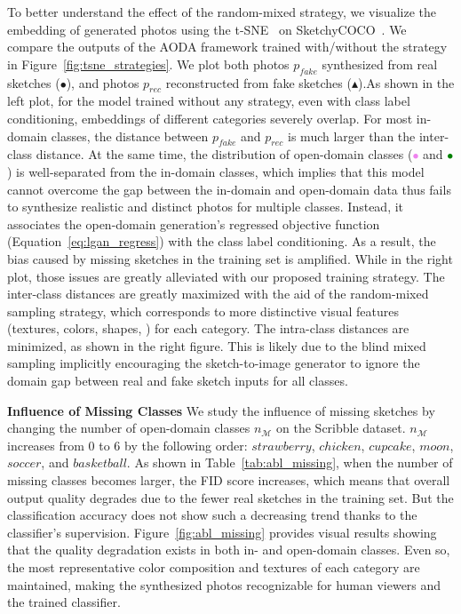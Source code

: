 \documentclass[10pt,twocolumn,letterpaper]{article}
\begin{document}
To better understand the effect of the random-mixed strategy, we visualize the embedding of generated photos using the t-SNE~\cite{tsne2008laurens} on SketchyCOCO~\cite{gao2020sketchycoco}. We compare the outputs of the AODA framework trained with/without the strategy in Figure~\ref{fig:tsne_strategies}. We plot both photos $p_{fake}$ synthesized from real sketches ($\bullet$), and photos $p_{rec}$ reconstructed from fake sketches ($\blacktriangle$).As shown in the left plot, for the model trained without any strategy, even with class label conditioning, embeddings of different categories severely overlap. For most in-domain classes, the distance between $p_{fake}$ and $p_{rec}$ is much larger than the inter-class distance. At the same time, the distribution of open-domain classes (\textcolor{violet}{$\bullet$} and \textcolor{green}{$\bullet$}) is well-separated from the in-domain classes, which implies that this model cannot overcome the gap between the in-domain and open-domain data thus fails to synthesize realistic and distinct photos for multiple classes. Instead, it associates the open-domain generation's regressed objective function (Equation~\ref{eq:lgan_regress}) with the class label conditioning. As a result, the bias caused by missing sketches in the training set is amplified. While in the right plot, those issues are greatly alleviated with our proposed training strategy. The inter-class distances are greatly maximized with the aid of the random-mixed sampling strategy, which corresponds to more distinctive visual features (textures, colors, shapes, \etc) for each category. The intra-class distances are minimized, as shown in the right figure. This is likely due to the blind mixed sampling implicitly encouraging the sketch-to-image generator to ignore the domain gap between real and fake sketch inputs for all classes.







\noindent \textbf{Influence of Missing Classes} We study the influence of missing sketches by changing the number of open-domain classes $n_{\mathcal{M}}$ on the Scribble dataset. $n_{\mathcal{M}}$ increases from 0 to 6 by the following order: $strawberry$, $chicken$, $cupcake$, $moon$, $soccer$, and $basketball$. As shown in Table~\ref{tab:abl_missing}, when the number of missing classes becomes larger, the FID score increases, which means that overall output quality degrades due to the fewer real sketches in the training set. But the classification accuracy does not show such a decreasing trend thanks to the classifier's supervision. Figure~\ref{fig:abl_missing} provides visual results showing that the quality degradation exists in both in- and open-domain classes. Even so, the most representative color composition and textures of each category are maintained, making the synthesized photos recognizable for human viewers and the trained classifier.
\end{document}
